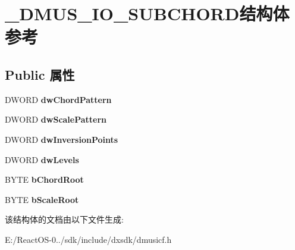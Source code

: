 \hypertarget{struct___d_m_u_s___i_o___s_u_b_c_h_o_r_d}{}\section{\+\_\+\+D\+M\+U\+S\+\_\+\+I\+O\+\_\+\+S\+U\+B\+C\+H\+O\+R\+D结构体 参考}
\label{struct___d_m_u_s___i_o___s_u_b_c_h_o_r_d}
\subsection*{Public 属性}
\begin{DoxyCompactItemize}
\item 
\mbox{\label{struct___d_m_u_s___i_o___s_u_b_c_h_o_r_d_ac0fcee1530a729db622f5cf898d30a86}} 
D\+W\+O\+RD {\bfseries dw\+Chord\+Pattern}
\item 
\mbox{\label{struct___d_m_u_s___i_o___s_u_b_c_h_o_r_d_a4610ce9ab3eca362f975a0f93ca4ea1a}} 
D\+W\+O\+RD {\bfseries dw\+Scale\+Pattern}
\item 
\mbox{\label{struct___d_m_u_s___i_o___s_u_b_c_h_o_r_d_a0ec773adb6facd006e95847dacf33bd6}} 
D\+W\+O\+RD {\bfseries dw\+Inversion\+Points}
\item 
\mbox{\label{struct___d_m_u_s___i_o___s_u_b_c_h_o_r_d_a3b578b6124924759e1e5c9e4f33deb9c}} 
D\+W\+O\+RD {\bfseries dw\+Levels}
\item 
\mbox{\label{struct___d_m_u_s___i_o___s_u_b_c_h_o_r_d_a36124fb7328833c62caa6afbe80a4340}} 
B\+Y\+TE {\bfseries b\+Chord\+Root}
\item 
\mbox{\label{struct___d_m_u_s___i_o___s_u_b_c_h_o_r_d_aa2f7bf4ff240aa18b1b6dc2b97b79ace}} 
B\+Y\+TE {\bfseries b\+Scale\+Root}
\end{DoxyCompactItemize}


该结构体的文档由以下文件生成\+:\begin{DoxyCompactItemize}
\item 
E\+:/\+React\+O\+S-\/0../sdk/include/dxsdk/dmusicf.\+h\end{DoxyCompactItemize}
